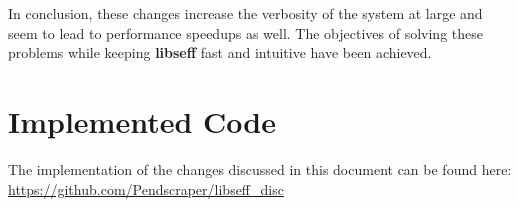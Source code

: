 \documentclass[logo,bsc,singlespacing,parskip,online]{infthesis}
\begin{document}

In conclusion, these changes increase the verbosity of the system at large and seem to lead to performance speedups as well. The objectives of solving these problems while keeping \textbf{libseff} fast and intuitive have been achieved.

% 
%
%
\printbibliography

\nocite{*}


\appendix

\chapter{Implemented Code}

The implementation of the changes discussed in this document can be found here: 
\url{https://github.com/Pendscraper/libseff_disc}


\todos
\end{document}
